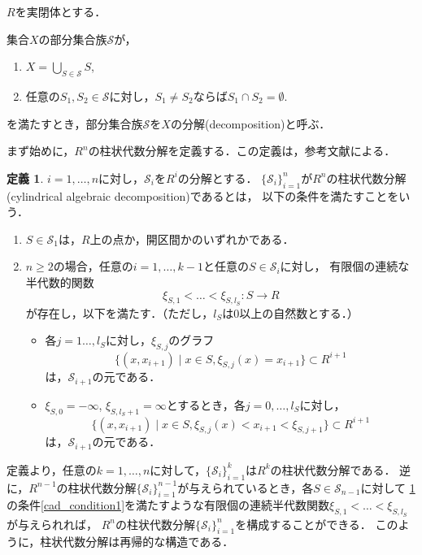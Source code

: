 \documentclass[uplatex, dvipdfmx]{jsarticle}
\newcommand{\calS}{\mathcal{S}}
\newcommand{\map}[3]{{#1}:{#2}\rightarrow{#3}}
\theoremstyle{definition}
\newtheorem{definition}{定義}[section]
\begin{document}
$R$を実閉体とする．

集合$X$の部分集合族$\calS$が，
\begin{enumerate}
     \item $X = \bigcup_{S \in \calS} S$,
     \item 任意の$S_1, S_2 \in \calS$に対し，$S_1 \neq S_2$ならば$S_1 \cap S_2 = \emptyset$.
\end{enumerate}
を満たすとき，部分集合族$\calS$を$X$の分解(decomposition)と呼ぶ．

まず始めに，$R^n$の柱状代数分解を定義する．この定義は，参考文献\cite{Basu}による．

\begin{definition} \label{definition:cad}
     $i=1, \dots, n$に対し，$\calS_i$を$R^i$の分解とする．
     $\{\calS_i\}_{i=1}^n$が$R^n$の柱状代数分解(cylindrical algebraic decomposition)であるとは，
     以下の条件を満たすことをいう．
     \begin{enumerate}
          \item $S \in \calS_1$は，$R$上の点か，開区間かのいずれかである．
          \item $n\geq 2$の場合，任意の$i=1, \dots, k-1$と任意の$S \in \calS_i$に対し，
          有限個の連続な半代数的関数
          \[
               \map{\xi_{S,1}< \dots <\xi_{S,l_S}}{S}{R}
          \]
          が存在し，以下を満たす．（ただし，$l_S$は0以上の自然数とする．）
          \begin{itemize}
               \item 各$j=1 \dots, l_S$に対し，$\xi_{S,j}$のグラフ
               \[
                    \{(x,x_{i+1}) \mid x \in S, \xi_{S,j}(x)=x_{i+1} \} \subset R^{i+1}
               \]
               は，$\calS_{i+1}$の元である．
               \item $\xi_{S,0}=-\infty$, $\xi_{S,l_S+1}=\infty$とするとき，各$j=0, \dots, l_S$に対し，\label{cad_condition1}
               \[
                    \{(x,x_{i+1}) \mid x \in S, \xi_{S,j}(x)<x_{i+1}<\xi_{S,j+1} \} \subset R^{i+1}
               \]
               は，$\calS_{i+1}$の元である．
          \end{itemize}
     \end{enumerate}
\end{definition}

定義より，任意の$k=1, \dots, n$に対して，$\{\calS_i\}_{i=1}^k$は$R^k$の柱状代数分解である．
逆に，$R^{n-1}$の柱状代数分解$\{\calS_i\}_{i=1}^{n-1}$が与えられているとき，各$S \in \calS_{n-1}$に対して
\cref{definition:cad}の条件\ref{cad_condition1}を満たすような有限個の連続半代数関数$\xi_{S,1}<\dots<\xi_{S,l_S}$が与えられれば，
$R^n$の柱状代数分解$\{\calS_i\}_{i=1}^n$を構成することができる．
このように，柱状代数分解は再帰的な構造である．
\end{document}
